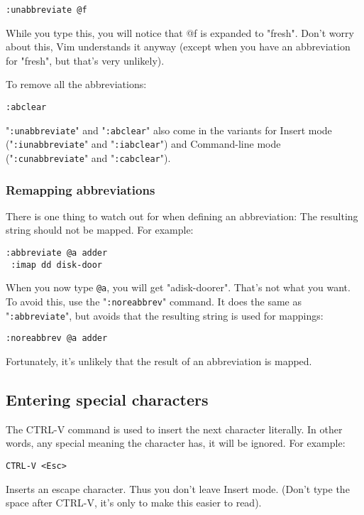 \begin{Verbatim}[samepage=true]
 :unabbreviate @f
\end{Verbatim}

While you type this, you will notice that @f is expanded to "fresh".
Don't worry about this, Vim understands it anyway (except when you have an abbreviation for "fresh", but that's very unlikely).

To remove all the abbreviations:

\begin{Verbatim}[samepage=true]
 :abclear
\end{Verbatim}

"\verb!:unabbreviate!" and "\verb!:abclear!" also come in the variants for Insert mode ("\verb!:iunabbreviate!" and "\verb!:iabclear!") and Command-line mode ("\verb!:cunabbreviate!" and "\verb!:cabclear!").
\subsubsection{Remapping abbreviations}
There is one thing to watch out for when defining an abbreviation: The resulting string should not be mapped.
For example:

\begin{Verbatim}[samepage=true]
 :abbreviate @a adder
 :imap dd disk-door
\end{Verbatim}

When you now type \verb!@a!, you will get "adisk-doorer".
That's not what you want.
To avoid this, use the "\verb!:noreabbrev!" command.
It does the same as "\verb!:abbreviate!", but avoids that the resulting string is used for mappings:

\begin{Verbatim}[samepage=true]
 :noreabbrev @a adder
\end{Verbatim}

Fortunately, it's unlikely that the result of an abbreviation is mapped.
\subsection{Entering special characters}
The CTRL-V command is used to insert the next character literally.
In other words, any special meaning the character has, it will be ignored.
For example:

\begin{Verbatim}[samepage=true]
 CTRL-V <Esc>
\end{Verbatim}

Inserts an escape character.
Thus you don't leave Insert mode.
(Don't type the space after CTRL-V, it's only to make this easier to read).

